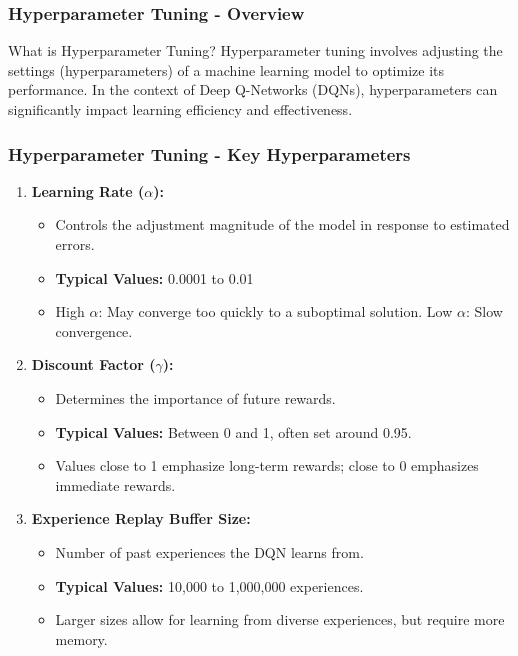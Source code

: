 \documentclass[aspectratio=169]{beamer}
\begin{document}
\begin{frame}[fragile]
    \frametitle{Hyperparameter Tuning - Overview}
    \begin{block}{What is Hyperparameter Tuning?}
        Hyperparameter tuning involves adjusting the settings (hyperparameters) of a machine learning model to optimize its performance. In the context of Deep Q-Networks (DQNs), hyperparameters can significantly impact learning efficiency and effectiveness.
    \end{block}
\end{frame}

\begin{frame}[fragile]
    \frametitle{Hyperparameter Tuning - Key Hyperparameters}
    \begin{enumerate}
        \item \textbf{Learning Rate ($\alpha$):}
            \begin{itemize}
                \item Controls the adjustment magnitude of the model in response to estimated errors.
                \item \textbf{Typical Values:} 0.0001 to 0.01
                \item High $\alpha$: May converge too quickly to a suboptimal solution. Low $\alpha$: Slow convergence.
            \end{itemize}
        
        \item \textbf{Discount Factor ($\gamma$):}
            \begin{itemize}
                \item Determines the importance of future rewards.
                \item \textbf{Typical Values:} Between 0 and 1, often set around 0.95.
                \item Values close to 1 emphasize long-term rewards; close to 0 emphasizes immediate rewards.
            \end{itemize}
        
        \item \textbf{Experience Replay Buffer Size:}
            \begin{itemize}
                \item Number of past experiences the DQN learns from.
                \item \textbf{Typical Values:} 10,000 to 1,000,000 experiences.
                \item Larger sizes allow for learning from diverse experiences, but require more memory.
            \end{itemize}
    \end{enumerate}
\end{frame}
\end{document}
